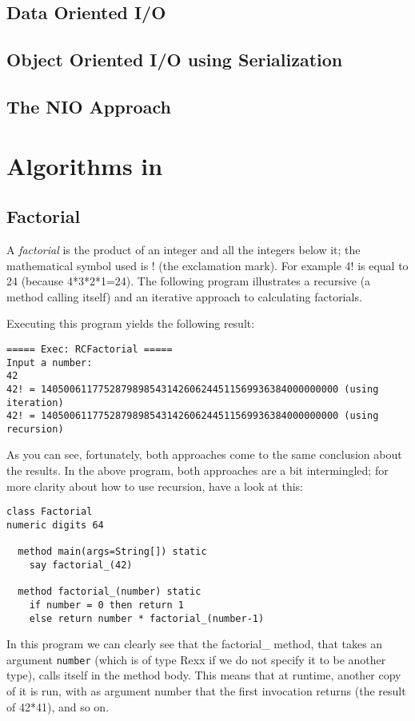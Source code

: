 {{\section{Data Oriented I/O}
\section{Object Oriented I/O using Serialization}
\section{The NIO Approach}
\chapter{Algorithms in \nr}{}
\section{Factorial}
A \emph{factorial} is the product of an integer and all the integers
below it; the mathematical symbol used is ! (the exclamation mark). For
example 4! is equal to 24 (because 4*3*2*1=24). The
following program illustrates a recursive (a method calling itself)
and an iterative approach to calculating factorials.

Executing this program yields the following result:
\begin{verbatim}
===== Exec: RCFactorial =====
Input a number: 
42
42! = 1405006117752879898543142606244511569936384000000000 (using iteration)
42! = 1405006117752879898543142606244511569936384000000000 (using recursion)
\end{verbatim}
As you can see, fortunately, both approaches come to the same
conclusion about the results. In the above program, both
approaches are a bit intermingled; for more clarity about how to use
recursion, have a look at this:
\begin{lstlisting}[label=factorialrecursive, caption=Factorial Recursive]
class Factorial
numeric digits 64

  method main(args=String[]) static
    say factorial_(42)

  method factorial_(number) static
    if number = 0 then return 1
    else return number * factorial_(number-1)

\end{lstlisting}
In this program we can clearly see that the factorial\_ method, that
takes an argument \texttt{number} (which is of type Rexx if we do not
specify it to be another type), calls itself in the method body. This
means that at runtime, another copy of it is run, with as argument
number that the first invocation returns (the result of 42*41), and so
on.

}}
